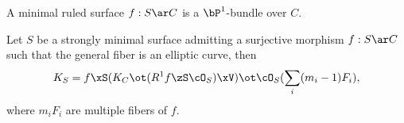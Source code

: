 \documentclass[a4paper, twoside]{article}
\begin{document}
\begin{thm}[Proposition~4.7]
	A minimal ruled surface $f:S\ar C$ is a $\bP^{1}$-bundle over $C$.
\end{thm}



\begin{thm}[Theorem~9.18]
	Let $S$ be a strongly minimal surface admitting a surjective morphism $f:S\ar C$ such that the general fiber is an elliptic curve, then
	\[
		K_{S}=f\xS(K_{C}\ot(R^{1}f\zS\cO_{S})\xV)\ot\cO_{S}(\sum_{i}(m_{i}-1)F_{i}),
	\]
	where $m_{i}F_{i}$ are multiple fibers of $f$.
\end{thm}


\printref
\end{document}
